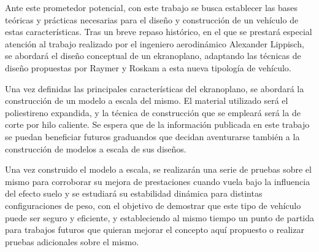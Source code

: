Ante este prometedor potencial, con este trabajo se busca establecer las bases teóricas y prácticas necesarias para el diseño y construcción de un vehículo de estas características. Tras un breve repaso histórico, en el que se prestará especial atención al trabajo realizado por el ingeniero aerodinámico Alexander Lippisch, se abordará el diseño conceptual de un ekranoplano, adaptando las técnicas de diseño propuestas por Raymer\cite{ref:raymer} y Roskam\cite{ref:roskam} a esta nueva tipología de vehículo.

Una vez definidas las principales características del ekranoplano, se abordará la construcción de un modelo a escala del mismo. El material utilizado será el poliestireno expandida, y la técnica de construcción que se empleará será la de corte por hilo caliente\cite{ref:hotwirecut}. Se espera que de la información publicada en este trabajo se puedan beneficiar futuros graduandos que decidan aventurarse también a la construcción de modelos a escala de sus diseños.

Una vez construido el modelo a escala, se realizarán una serie de pruebas sobre el mismo para corroborar su mejora de prestaciones cuando vuela bajo la influencia del efecto suelo y se estudiará su estabilidad dinámica para distintas configuraciones de peso, con el objetivo de demostrar que este tipo de vehículo puede ser seguro y eficiente, y estableciendo al mismo tiempo un punto de partida para trabajos futuros que quieran mejorar el concepto aquí propuesto o realizar pruebas adicionales sobre el mismo.
